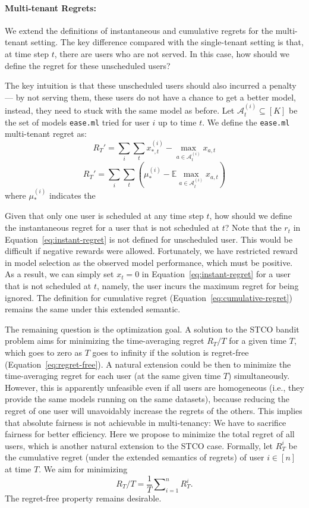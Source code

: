 \documentclass[letterpaper]{vldb}
\newcommand{\eml}{\texttt{ease.ml}\xspace}
\newcommand{\cA}{\mathcal{A}}
\begin{document}
\vspace{-0.5em}
\paragraph*{Multi-tenant Regrets:} 
We extend the definitions of instantaneous and cumulative 
regrets for the multi-tenant setting. The key difference
compared with the single-tenant setting is that,
at time step $t$, there are users who are not
served. In this case, how should we define
the regret for these unscheduled users?

The key intuition is that these unscheduled users should
also incurred a penalty --- by not serving them,
these users do not have a chance to
get a better model, instead, they need to stuck
with the same model as before. Let $\cA_t^{(i)} \subseteq [K]$
be the set of models \eml tried for user $i$
up to time $t$. We define the \eml multi-tenant
regret as:
\[
R_T' = \sum_i \sum_t x^{(i)}_{*,t} - \max_{a \in \cA_t^{(i)}} x_{a, t}
\]
{\color{red}
\[
R_T' = \sum_i \sum_t \left(\mu^{(i)}_{*} - \mathbb{E}\max_{a \in \cA_t^{(i)}} x_{a, t}\right)
\]
where $\mu^(i)_*$ indicates the 
}


Given that only one user is scheduled at any time step $t$, how should we define the instantaneous regret for a user that is not scheduled at $t$?
Note that the $r_t$ in Equation~\ref{eq:instant-regret} is not defined for unscheduled user.
This would be difficult if negative rewards were allowed.
Fortunately, we have restricted reward in model selection as the observed model performance, which must be positive.
As a result, we can simply set $x_t=0$ in Equation~\ref{eq:instant-regret} for a user that is not scheduled at $t$, namely, the user incurs the maximum regret for being ignored.
The definition for cumulative regret (Equation~\ref{eq:cumulative-regret}) remains the same under this extended semantic.

The remaining question is the optimization goal.
A solution to the STCO bandit problem aims for minimizing the time-averaging regret $R_T/T$ for a given time $T$, which goes to zero as $T$ goes to infinity if the solution is regret-free (Equation~\ref{eq:regret-free}).
A natural extension could be then to minimize the time-averaging regret for each user (at the same given time $T$) simultaneously.
However, this is apparently unfeasible even if all users are homogeneous (i.e., they provide the same models running on the same datasets), because reducing the regret of one user will unavoidably increase the regrets of the others.
This implies that absolute fairness is not achievable in multi-tenancy: We have to sacrifice fairness for better efficiency.
Here we propose to minimize the total regret of all users, which is another natural extension to the STCO case.
Formally, let $R_T^i$ be the cumulative regret (under the extended semantics of regrets) of user $i\in[n]$ at time $T$.
We aim for minimizing
\begin{equation}\label{eq:time-avg-regret}
R_T/T=\frac{1}{T}\sum\nolimits_{i=1}^n R_T^i.
\end{equation}
The regret-free property remains desirable.
\end{document}
